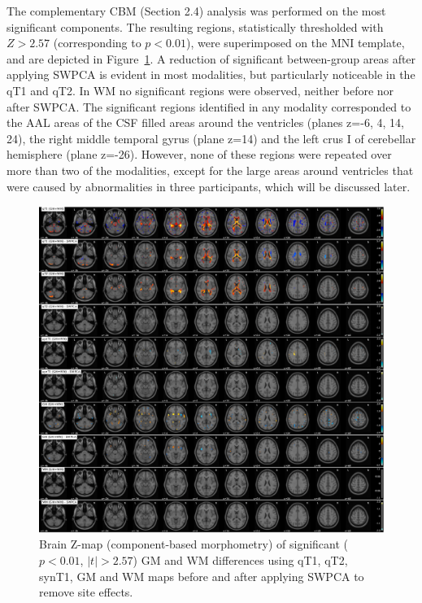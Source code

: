 The complementary CBM (Section 2.4) analysis was performed on the most
significant components. The resulting regions, statistically
thresholded with $Z>2.57$ (corresponding to $p<0.01$), were superimposed on the
\ac{MNI} template, and are depicted in Figure~\ref{fig:swpcaFIGURE05}. A reduction of significant
between-group areas after applying SWPCA is evident in most modalities,
but particularly noticeable in the \ac{qT1} and \ac{qT2}. In \ac{WM} no significant
regions were observed, neither before nor after SWPCA. The significant
regions identified in any modality corresponded to the AAL areas of the
CSF filled areas around the ventricles (planes z=-6, 4, 14, 24), the
right middle temporal gyrus (plane z=14) and the left crus I of
cerebellar hemisphere (plane z=-26). However, none of these regions
were repeated over more than two of the modalities, except for the
large areas around ventricles that were caused by abnormalities in
three participants, which will be discussed later.

\begin{figure}
	\centering
	\includegraphics[width=\linewidth]{gfx/ch8/FIGURE05}
	\caption{Brain Z-map (component-based morphometry) of significant ($p<0.01$, $|t|>2.57$) \ac{GM} and \ac{WM} differences using \ac{qT1}, \ac{qT2}, \ac{synT1}, \ac{GM} and \ac{WM} maps before and after applying \ac{SWPCA} to remove site effects.}
	\label{fig:swpcaFIGURE05}
\end{figure}

